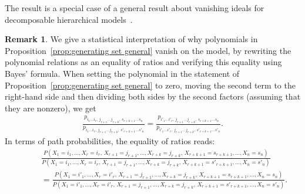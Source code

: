 \documentclass[11pt, a4paper]{article}
\numberwithin{equation}{section}
\theoremstyle{plain}
\theoremstyle{definition}
\newtheorem{remark}[theorem]{Remark}
\begin{document}
The result is a special case of a general result about vanishing ideals for decomposable hierarchical models~\cite[Theorem 4.5]{dobra2003markov}.
\begin{remark}\label{rem:nonhom-subideal}
We give a statistical interpretation of why polynomials in Proposition~\ref{prop:generating set general} vanish on the model, by rewriting the polynomial relations as an equality of ratios and verifying this equality using Bayes' formula.  When setting the polynomial in the statement of Proposition~\ref{prop:generating set general} to zero, moving the second term to the right-hand side and then dividing both sides by the second factors (assuming that they are nonzero), we get
\begin{align*}
\frac{p_{i_1\ldots i_r,\, j_{r+1}\ldots j_{r+k},\, s_{r+k+1}\ldots s_n}}{p_{i_1\ldots i_r,\, j_{r+1}\ldots j_{r+k},\, s'_{r+k+1}\ldots s'_n}} = 
\frac{p_{i'_1\ldots i'_r,\, j_{r+1}\ldots j_{r+k},\, s_{r+k+1}\ldots s_n}}{p_{i'_1\ldots i'_r,\, j_{r+1}\ldots j_{r+k},\, s'_{r+k+1}\ldots s'_n}}.
\end{align*}
In terms of path probabilities, the equality of ratios reads:
\begin{align*}
&\qquad\frac{
P\!\left(
X_1=i_1,\ldots,X_r=i_r,\,
X_{r+1}=j_{r+1},\ldots,X_{r+k}=j_{r+k},\,
X_{r+k+1}=s_{r+k+1},\ldots,X_n=s_n
\right)}
{
P\!\left(
X_1=i_1,\ldots,X_r=i_r,\,
X_{r+1}=j_{r+1},\ldots,X_{r+k}=j_{r+k},\,
X_{r+k+1}=s'_{r+k+1},\ldots,X_n=s'_n
\right)}
\\
&\qquad=\frac{
P\!\left(
X_1=i'_1,\ldots,X_r=i'_r,\,
X_{r+1}=j_{r+1},\ldots,X_{r+k}=j_{r+k},\,
X_{r+k+1}=s_{r+k+1},\ldots,X_n=s_n
\right)}
{
P\!\left(
X_1=i'_1,\ldots,X_r=i'_r,\,
X_{r+1}=j_{r+1},\ldots,X_{r+k}=j_{r+k},\,
X_{r+k+1}=s'_{r+k+1},\ldots,X_n=s'_n
\right)}.
\end{align*}


\end{remark}
\end{document}
